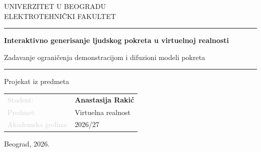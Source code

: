 \documentclass{article}
\begin{document}
\begin{titlepage}
    \centering

    \vspace*{1.5cm}

    {\large\color{titlegray}
    UNIVERZITET U BEOGRADU\\[0.15cm]
    ELEKTROTEHNIČKI FAKULTET
    }

    \vspace{2.8cm}

    {\color{linkblue}\rule{0.85\textwidth}{1.2pt}}

    \vspace{0.7cm}

    {\Huge\bfseries\color{titlegray}
    Interaktivno generisanje ljudskog pokreta u virtuelnoj realnosti
    \par}

    \vspace{0.3cm}

    {\LARGE\color{linkblue}
    Zadavanje ograničenja demonstracijom i difuzioni modeli pokreta
    \par}

    \vspace{0.7cm}

    {\color{linkblue}\rule{0.85\textwidth}{1.2pt}}

    \vspace{1.2cm}

    {\large
    Projekat iz predmeta
    \par}

    \vfill

    \begin{tabular}{@{}ll@{}}
        \textcolor{lightgray}{Student:} &
        \textbf{Anastasija Rakić} \\[0.25cm]

        \textcolor{lightgray}{Predmet:} &
        Virtuelna realnost \\[0.25cm]

        \textcolor{lightgray}{Akademska godina:} &
        2026/27
    \end{tabular}

    \vspace{1.8cm}

    {\color{lightgray}
    Beograd, 2026.
    }

    \vspace{0.7cm}

\end{titlepage}
\end{document}
